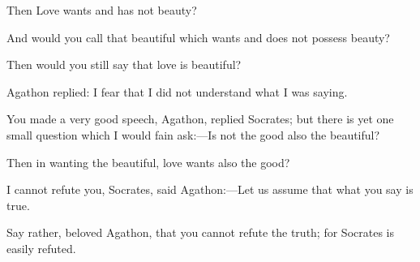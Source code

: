 \para[106] Then Love wants and has not beauty?

\para[107] And would you call that beautiful which wants and does not possess beauty?

\para[108] Then would you still say that love is beautiful?

\para[109] Agathon replied: I fear that I did not understand what I was saying.

\para[110] You made a very good speech, Agathon, replied Socrates; but there is yet one small question which I would fain ask:---Is not the good also the beautiful?

\para[111] Then in wanting the beautiful, love wants also the good?

\para[112] I cannot refute you, Socrates, said Agathon:---Let us assume that what you say is true.

\para[113] Say rather, beloved Agathon, that you cannot refute the truth; for Socrates is easily refuted.

